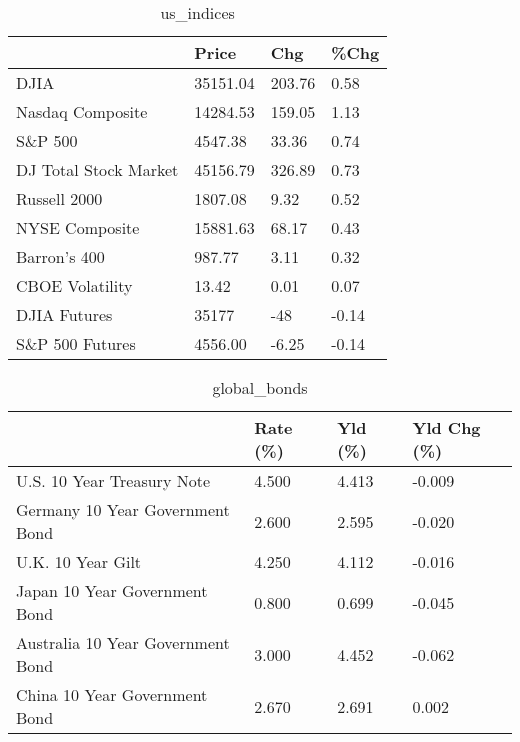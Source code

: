 \documentclass{article}%
\begin{document}
%


\begin{table}[htbp]%
\caption{us\_indices}%
\centering%
\begin{adjustbox}{width=1\textwidth}%
\begin{tabular}{llll}
\toprule
                      &    Price &    Chg &  \%Chg \\
\midrule
                 DJIA & 35151.04 & 203.76 &  0.58 \\
     Nasdaq Composite & 14284.53 & 159.05 &  1.13 \\
              S\&P 500 &  4547.38 &  33.36 &  0.74 \\
DJ Total Stock Market & 45156.79 & 326.89 &  0.73 \\
         Russell 2000 &  1807.08 &   9.32 &  0.52 \\
       NYSE Composite & 15881.63 &  68.17 &  0.43 \\
         Barron's 400 &   987.77 &   3.11 &  0.32 \\
      CBOE Volatility &    13.42 &   0.01 &  0.07 \\
         DJIA Futures &    35177 &    -48 & -0.14 \\
      S\&P 500 Futures &  4556.00 &  -6.25 & -0.14 \\
\bottomrule
\end{tabular}
%
\end{adjustbox}%
\end{table}

%


\begin{table}[htbp]%
\caption{global\_bonds}%
\centering%
\begin{adjustbox}{width=1\textwidth}%
\begin{tabular}{llll}
\toprule
                                  & Rate (\%) & Yld (\%) & Yld Chg (\%) \\
\midrule
       U.S. 10 Year Treasury Note &    4.500 &   4.413 &      -0.009 \\
  Germany 10 Year Government Bond &    2.600 &   2.595 &      -0.020 \\
                U.K. 10 Year Gilt &    4.250 &   4.112 &      -0.016 \\
    Japan 10 Year Government Bond &    0.800 &   0.699 &      -0.045 \\
Australia 10 Year Government Bond &    3.000 &   4.452 &      -0.062 \\
    China 10 Year Government Bond &    2.670 &   2.691 &       0.002 \\
\bottomrule
\end{tabular}
%
\end{adjustbox}%
\end{table}
\end{document}
